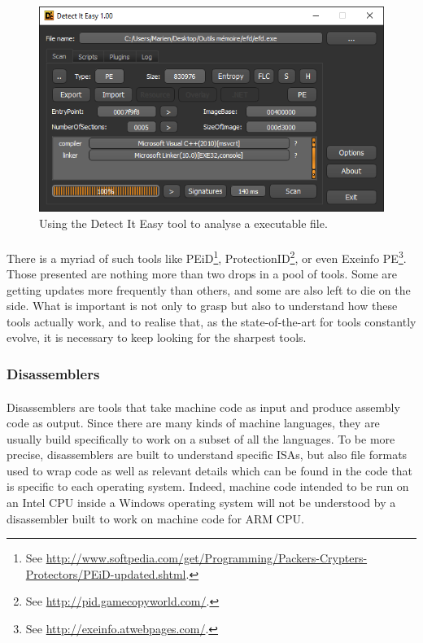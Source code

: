 \begin{figure}[!htb]
	\centering
	\includegraphics[width=1\textwidth]{reverse_engineering/die.png}
	\caption{Using the Detect It Easy tool to analyse a executable file.}
	\label{fig:detect_it_easy}
\end{figure}

\paragraph{}
There is a myriad of such tools like PEiD\footnote{See \url{http://www.softpedia.com/get/Programming/Packers-Crypters-Protectors/PEiD-updated.shtml}.}, ProtectionID\footnote{See \url{http://pid.gamecopyworld.com/}.}, or even Exeinfo PE\footnote{See \url{http://exeinfo.atwebpages.com/}.}. Those presented are nothing more than two drops in a pool of tools. Some are getting updates more frequently than others, and some are also left to die on the side. What is important is not only to grasp but also to understand how these tools actually work, and to realise that, as the state-of-the-art for tools constantly evolve, it is necessary to keep looking for the sharpest tools.

\subsubsection{Disassemblers} \label{disassembler}
\paragraph{}
Disassemblers are tools that take machine code as input and produce assembly code as output. Since there are many kinds of machine languages, they are usually build specifically to work on a subset of all the languages. To be more precise, disassemblers are built to understand specific ISAs, but also file formats used to wrap code as well as relevant details which can be found in the code that is specific to each operating system. Indeed, machine code intended to be run on an Intel CPU inside a Windows operating system will not be understood by a disassembler built to work on machine code for ARM CPU. 

